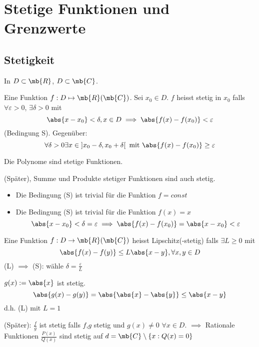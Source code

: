 \section{Stetige Funktionen und Grenzwerte}
\subsection{Stetigkeit}
In $D\subset\mb{R}$, $D\subset\mb{C}$.
\begin{Def}
  Eine Funktion $f:D\mapsto \mb{R}(\mb{C})$. Sei $x_0\in D$. $f$ heisst stetig in $x_0$ falls $\forall \varepsilon >0$, $\exists\delta>0$ mit
  \[\abs{x-x_0}<\delta, x\in D\implies \abs{f(x)-f(x_0)}<\varepsilon\]
  (Bedingung S). Gegenüber:
  \[\forall\delta>0 \exists x\in\left] x_0-\delta,x_0+\delta  \right[\text{ mit } \abs{f(x)-f(x_0)}\geq \varepsilon\]
\end{Def}
\begin{Bsp}
  Die Polynome sind stetige Funktionen.
\end{Bsp}
\begin{Bsp}
  (Später), Summe und Produkte stetiger Funktionen sind auch stetig.
\end{Bsp}
\begin{Bem}
  \begin{itemize}
    \item Die Bedingung (S) ist trivial für die Funktion $f=const$
    \item Die Bedingung (S) ist trivial für die Funktion $f(x)=x$
      \[\abs{x-x_0}<\delta=\varepsilon\implies\abs{f(x)-f(x_0)}=\abs{x-x_0}<\varepsilon\]
  \end{itemize}
\end{Bem}
\begin{Def}
  Eine Funktion $f:D\to \mb{R}(\mb{C})$ heisst Lipschitz(-stetig) falls $\exists L\geq 0$ mit
  \[\abs{f(x)-f(y)}\leq L\abs{x-y}, \forall x,y\in D\]
  (L) $\implies$ (S): wähle $\delta=\frac{\varepsilon}{L}$
\end{Def}
\begin{Kor}
  $g(x):=\abs{x}$ ist stetig.
  \[\abs{g(x)-g(y)}=\abs{\abs{x}-\abs{y}}\leq\abs{x-y}\]
  d.h. (L) mit $L=1$
\end{Kor}
\begin{Bsp}
  (Später): $\frac{f}{g}$ ist stetig falls $f$,$g$ stetig und $g(x)\neq 0$ $\forall x\in D$. $\implies$ Rationale Funktionen $\frac{P(x)}{Q(x)}$ sind stetig auf $d=\mb{C}\setminus\left\{ x:Q(x)=0 \right\}$
\end{Bsp}
